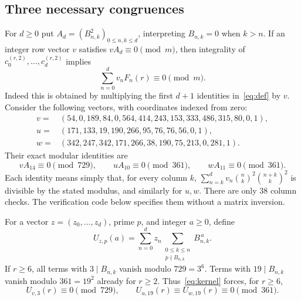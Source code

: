 \documentclass[11pt]{article}
\begin{document}
\subsection*{Three necessary congruences}
For $d\ge0$ put $A_d=(B_{n,k}^2)_{0\le n,k\le d}$, interpreting
$B_{n,k}=0$ when $k>n$. If an integer row vector $v$ satisfies
$vA_d\equiv0\pmod m$, then integrality of $c_0^{(r,2)},\ldots,c_d^{(r,2)}$
implies
\begin{equation}\label{eq:necessary}
 \sum_{n=0}^d v_n F_n(r)\equiv0\pmod m.
\end{equation}
Indeed this is obtained by multiplying the first $d+1$ identities
in~\eqref{eq:def} by $v$. Consider the following vectors, with coordinates
indexed from zero:
\begin{align*}
v={}&(54,0,189,84,0,564,414,243,153,333,486,315,80,0,1),\\
u={}&(171,133,19,190,266,95,76,76,56,0,1),\\
w={}&(342,247,342,171,266,38,190,75,213,0,281,1).
\end{align*}
Their exact modular identities are
\begin{equation}\label{eq:kernel}
 vA_{14}\equiv0\pmod{729},\qquad
 uA_{10}\equiv0\pmod{361},\qquad
 wA_{11}\equiv0\pmod{361}.
\end{equation}
Each identity means simply that, for every column $k$,
$\sum_{n=k}^d v_n\binom nk^2\binom{n+k}{k}^2$ is divisible by the stated
modulus, and similarly for $u,w$. There are only 38 column checks.
The verification code below specifies them without a matrix inversion.

For a vector $z=(z_0,\ldots,z_d)$, prime $p$, and integer $a\ge0$, define
\[
 U_{z,p}(a)=\sum_{n=0}^d z_n
       \sum_{\substack{0\le k\le n\\p\nmid B_{n,k}}}B_{n,k}^{\,a}.
\]
If $r\ge6$, all terms with $3\mid B_{n,k}$ vanish modulo $729=3^6$.
Terms with $19\mid B_{n,k}$ vanish modulo $361=19^2$ already for $r\ge2$.
Thus~\eqref{eq:kernel} forces, for $r\ge6$,
\begin{equation}\label{eq:units}
 U_{v,3}(r)\equiv0\pmod{729},\qquad
 U_{u,19}(r)\equiv U_{w,19}(r)\equiv0\pmod{361}.
\end{equation}
\end{document}
